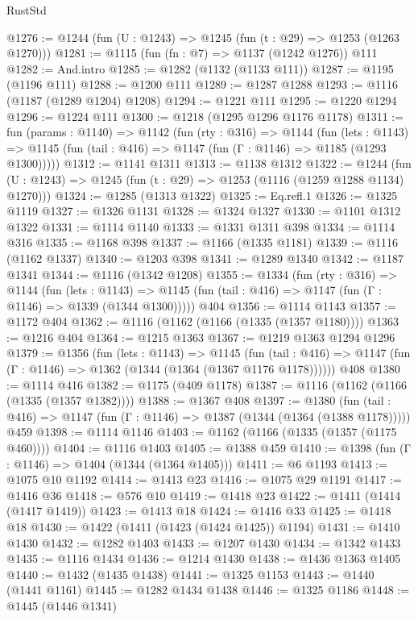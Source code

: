\begin{lexlean}{RustStd}
\begin{coremodule}
{\begin{coremodule}
{{{{{{{{{{{@1276 := @1244 (fun (U : @1243) => @1245 (fun (t : @29) => @1253 (@1263 @1270)))
@1281 := @1115 (fun (fn : @7) => @1137 (@1242 @1276)) @111
@1282 := And.intro
@1285 := @1282 (@1132 (@1133 @111))
@1287 := @1195 (@1196 @111)
@1288 := @1200 @111
@1289 := @1287 @1288
@1293 := @1116 (@1187 (@1289 @1204) @1208)
@1294 := @1221 @111
@1295 := @1220 @1294
@1296 := @1224 @111
@1300 := @1218 (@1295 @1296 @1176 @1178)
@1311 := fun (params : @1140) =>
  @1142
    (fun (rty : @316) =>
    @1144
      (fun (lets : @1143) =>
      @1145 (fun (tail : @416) => @1147 (fun (Γ : @1146) => @1185 (@1293 @1300)))))
@1312 := @1141 @1311
@1313 := @1138 @1312
@1322 := @1244 (fun (U : @1243) => @1245 (fun (t : @29) => @1253 (@1116 (@1259 @1288 @1134) @1270)))
@1324 := @1285 (@1313 @1322)
@1325 := Eq.refl.{1}
@1326 := @1325 @1119
@1327 := @1326 @1131
@1328 := @1324 @1327
@1330 := @1101 @1312 @1322
@1331 := @1114 @1140
@1333 := @1331 @1311 @398
@1334 := @1114 @316
@1335 := @1168 @398
@1337 := @1166 (@1335 @1181)
@1339 := @1116 (@1162 @1337)
@1340 := @1203 @398
@1341 := @1289 @1340
@1342 := @1187 @1341
@1344 := @1116 (@1342 @1208)
@1355 := @1334
    (fun (rty : @316) =>
    @1144
      (fun (lets : @1143) =>
      @1145 (fun (tail : @416) => @1147 (fun (Γ : @1146) => @1339 (@1344 @1300)))))
    @404
@1356 := @1114 @1143
@1357 := @1172 @404
@1362 := @1116 (@1162 (@1166 (@1335 (@1357 @1180))))
@1363 := @1216 @404
@1364 := @1215 @1363
@1367 := @1219 @1363 @1294 @1296
@1379 := @1356
    (fun (lets : @1143) =>
    @1145
      (fun (tail : @416) => @1147 (fun (Γ : @1146) => @1362 (@1344 (@1364 (@1367 @1176 @1178))))))
    @408
@1380 := @1114 @416
@1382 := @1175 (@409 @1178)
@1387 := @1116 (@1162 (@1166 (@1335 (@1357 @1382))))
@1388 := @1367 @408
@1397 := @1380
    (fun (tail : @416) => @1147 (fun (Γ : @1146) => @1387 (@1344 (@1364 (@1388 @1178)))))
    @459
@1398 := @1114 @1146
@1403 := @1162 (@1166 (@1335 (@1357 (@1175 @460))))
@1404 := @1116 @1403
@1405 := @1388 @459
@1410 := @1398 (fun (Γ : @1146) => @1404 (@1344 (@1364 @1405)))
@1411 := @6 @1193
@1413 := @1075 @10 @1192
@1414 := @1413 @23
@1416 := @1075 @29 @1191
@1417 := @1416 @36
@1418 := @576 @10
@1419 := @1418 @23
@1422 := @1411 (@1414 (@1417 @1419))
@1423 := @1413 @18
@1424 := @1416 @33
@1425 := @1418 @18
@1430 := @1422 (@1411 (@1423 (@1424 @1425)) @1194)
@1431 := @1410 @1430
@1432 := @1282 @1403
@1433 := @1207 @1430
@1434 := @1342 @1433
@1435 := @1116 @1434
@1436 := @1214 @1430
@1438 := @1436 @1363 @1405
@1440 := @1432 (@1435 @1438)
@1441 := @1325 @1153
@1443 := @1440 (@1441 @1161)
@1445 := @1282 @1434 @1438
@1446 := @1325 @1186
@1448 := @1445 (@1446 @1341)
}}}}}}}}}}}
\end{coremodule}}
\end{coremodule}
\end{lexlean}
